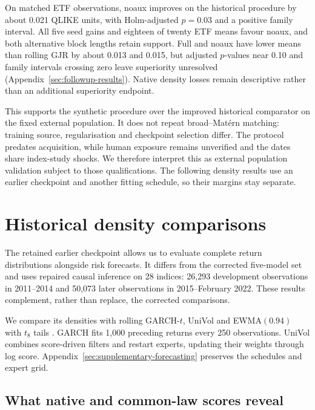 

On matched ETF observations, noaux improves on the historical procedure by about 0.021 QLIKE units, with Holm-adjusted $p=0.03$ and a positive family interval. All five seed gains and eighteen of twenty ETF means favour noaux, and both alternative block lengths retain support. Full and noaux have lower means than rolling GJR by about 0.013 and 0.015, but adjusted $p$-values near 0.10 and family intervals crossing zero leave superiority unresolved (Appendix~\ref{sec:followup-results}). Native density losses remain descriptive rather than an additional superiority endpoint.

This supports the synthetic procedure over the improved historical comparator on the fixed external population. It does not repeat broad--Mat\'ern matching: training source, regularisation and checkpoint selection differ. The protocol predates acquisition, while human exposure remains unverified and the dates share index-study shocks. We therefore interpret this as external population validation subject to those qualifications. The following density results use an earlier checkpoint and another fitting schedule, so their margins stay separate.
\FloatBarrier

\section{Historical density comparisons}
\label{sec:historical-density}

The retained earlier checkpoint allows us to evaluate complete return distributions alongside risk forecasts. It differs from the corrected five-model set and uses repaired causal inference on 28 indices: 26,293 development observations in 2011--2014 and 50,073 later observations in 2015--February 2022. These results complement, rather than replace, the corrected comparisons.

We compare its densities with rolling GARCH-$t$, UniVol and EWMA$(0.94)$ with $t_8$ tails \citep{bollerslev1986generalized,riskmetrics1996}. GARCH fits 1,000 preceding returns every 250 observations. UniVol combines score-driven filters and restart experts, updating their weights through log score. Appendix~\ref{sec:supplementary-forecasting} preserves the schedules and expert grid.

\subsection{What native and common-law scores reveal}

